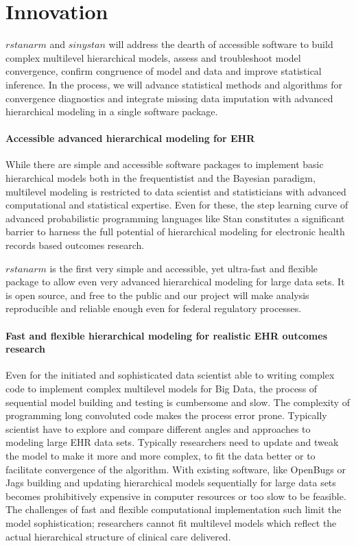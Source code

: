 \documentclass[11pt,notitlepage]{article}
\begin{document}
\part*{Innovation}

$rstanarm$ and $sinystan$ will address the dearth of accessible software to build complex multilevel hierarchical models, assess and troubleshoot model convergence, confirm congruence of model and data and improve statistical inference. In the process, we will advance statistical methods and algorithms for convergence diagnostics and integrate missing data imputation with advanced hierarchical modeling in a single software package.  

\subsection*{Accessible advanced hierarchical modeling for EHR}

While there are simple and accessible software packages to implement basic hierarchical models both in the frequentistist and the Bayesian paradigm, multilevel modeling is restricted to data scientist and statisticians with advanced computational and statistical expertise. Even for these, the step learning curve of advanced probabilistic programming languages like Stan constitutes a significant barrier to harness the full potential of hierarchical modeling for electronic health records based outcomes research.

$rstanarm$ is the first very simple and accessible, yet ultra-fast and flexible package to allow even very advanced hierarchical modeling for large data sets. It is open source, and free to the public and our project will make analysis reproducible and reliable enough even for federal regulatory processes. 

\subsection*{Fast and flexible hierarchical modeling for realistic EHR outcomes research }

Even for the initiated and sophisticated data scientist able to writing complex code to implement complex multilevel models for Big Data, the process of sequential model building and testing is cumbersome and slow. The complexity of programming long convoluted code makes the process error prone. Typically scientist have to explore and compare different angles and approaches to modeling large EHR data sets. Typically researchers need to update and tweak the model to make it more and more complex, to fit the data better or to facilitate convergence of the algorithm. With existing software, like OpenBugs or Jags building and updating hierarchical models sequentially for large data sets becomes prohibitively expensive in computer resources or too slow to be feasible. The challenges of fast and flexible computational implementation such limit the model sophistication;  researchers cannot fit multilevel models which reflect the actual hierarchical structure of clinical care delivered. 
\end{document}
